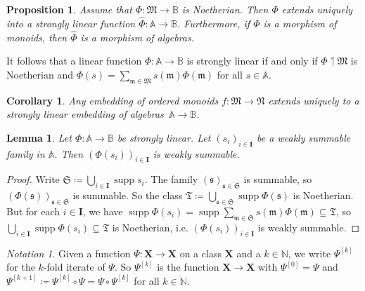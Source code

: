 \documentclass{article}
\newcommand{\assign}{\coloneqq}
\newcommand{\of}{:}
\newcommand{\tmem}[1]{{\em #1\/}}
\newcommand{\tmop}[1]{\ensuremath{\operatorname{#1}}}
\newtheorem{corollary}[theorem]{Corollary}
\newtheorem{proposition}[theorem]{Proposition}
\newtheorem{lemma}[theorem]{Lemma}
\theoremstyle{remark}\newtheorem*{convention*}{Convention}
\newtheorem{notation}[theorem]{Notation}
\begin{document}
\begin{proposition}
  \label{prop-strongly-linear-extension}{\tmem{{\cite[Proposition~3.5]{vdH:noeth}}}}
  Assume that $\Phi \of \mathfrak{M} \longrightarrow \mathbb{B}$ is
  Noetherian. Then $\Phi$ extends uniquely into a strongly linear function
  $\hat{\Phi} \of \mathbb{A} \longrightarrow \mathbb{B}$. Furthermore, if
  $\Phi$ is a morphism of monoids, then $\hat{\Phi}$ is a morphism of
  algebras.
\end{proposition}

It follows that a linear function $\Phi \of \mathbb{A} \longrightarrow
\mathbb{B}$ is strongly linear if and only if $\Phi \upharpoonleft
\mathfrak{M}$ is Noetherian and $\Phi (s) = \sum_{\mathfrak{m} \in
\mathfrak{M}} s (\mathfrak{m}) \Phi (\mathfrak{m})$ for all $s \in
\mathbb{A}$.

\begin{corollary}
  \label{cor-Noetherian-subgroup}Any embedding of ordered monoids $f \of
  \mathfrak{M} \longrightarrow \mathfrak{N}$ extends uniquely to a strongly
  linear embedding of algebras~$\mathbb{A} \longrightarrow \mathbb{B}$.
\end{corollary}

\begin{lemma}
  \label{lem-Noetherian-function}Let $\Phi \of \mathbb{A} \longrightarrow
  \mathbb{B}$ be strongly linear. Let $(s_i)_{i \in \mathbf{I}}$ be a weakly
  summable family in $\mathbb{A}$. Then $(\Phi (s_i))_{i \in \mathbf{I}}$ is
  weakly summable.
\end{lemma}

\begin{proof}
  Write $\mathfrak{S} \assign \bigcup_{i \in \mathbf{I}} \tmop{supp} s_i$. The
  family $(\mathfrak{s})_{\mathfrak{s} \in \mathfrak{S}}$ is summable, so
  $(\Phi (\mathfrak{s}))_{\mathfrak{s} \in \mathfrak{S}}$ is summable. So the
  class $\mathfrak{T} \assign \bigcup_{\mathfrak{s} \in \mathfrak{S}}
  \tmop{supp} \Phi (\mathfrak{s})$ is Noetherian. But for each $i \in
  \mathbf{I}$, we have $\tmop{supp} \Phi (s_i) = \tmop{supp}
  \sum_{\mathfrak{m} \in \mathfrak{S}} s (\mathfrak{m}) \Phi (\mathfrak{m})
  \subseteq \mathfrak{T}$, so $\bigcup_{i \in \mathbf{I}} \tmop{supp} \Phi
  (s_i) \subseteq \mathfrak{T}$ is Noetherian, i.e. $(\Phi (s_i))_{i \in
  \mathbf{I}}$ is weakly summable.
\end{proof}

\begin{notation}
  Given a function $\Psi \of \mathbf{X} \longrightarrow \mathbf{X}$ on a class
  $\mathbf{X}$ and a $k \in \mathbb{N}$, we write
  $\Psi^{[k]}$\label{autolab15} for the $k$-fold iterate of $\Psi$. So
  $\Psi^{[k]}$ is the function $\mathbf{X} \longrightarrow \mathbf{X}$ with
  $\Psi^{[0]} = \Psi$ and $\Psi^{[k + 1]} \assign \Psi^{[k]} \circ \Psi = \Psi
  \circ \Psi^{[k]}$ for all $k \in \mathbb{N}$.
\end{notation}
\end{document}
